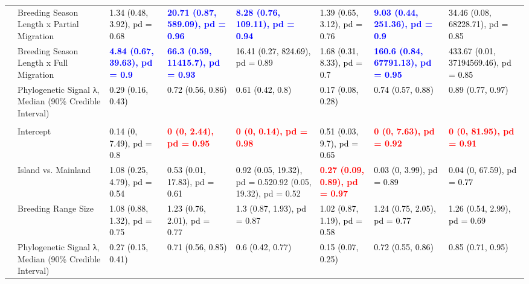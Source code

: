 \documentclass[
  a4paper,
]{article}
\begin{document}
\begin{landscape}
\begin{table}
{\begin{tabular}[t]{llllllll}
 & Breeding Season Length x Partial Migration & \textcolor{black}{1.34 (0.48, 3.92), pd = 0.68} & \textcolor{blue}{\textbf{20.71 (0.87, 589.09), pd = 0.96}} & \textcolor{blue}{\textbf{8.28 (0.76, 109.11), pd = 0.94}} & \textcolor{black}{1.39 (0.65, 3.12), pd = 0.76} & \textcolor{blue}{\textbf{9.03 (0.44, 251.36), pd = 0.9}} & \textcolor{black}{34.46 (0.08, 68228.71), pd = 0.85}\\
 & Breeding Season Length x Full Migration & \textcolor{blue}{\textbf{4.84 (0.67, 39.63), pd = 0.9}} & \textcolor{blue}{\textbf{66.3 (0.59, 11415.7), pd = 0.93}} & \textcolor{black}{16.41 (0.27, 824.69), pd = 0.89} & \textcolor{black}{1.68 (0.31, 8.33), pd = 0.7} & \textcolor{blue}{\textbf{160.6 (0.84, 67791.13), pd = 0.95}} & \textcolor{black}{433.67 (0.01, 37194569.46), pd = 0.85}\\
 & Phylogenetic Signal λ, Median (90\% Credible Interval) & \textcolor{black}{0.29 (0.16, 0.43)} & \textcolor{black}{0.72 (0.56, 0.86)} & \textcolor{black}{0.61 (0.42, 0.8)} & \textcolor{black}{0.17 (0.08, 0.28)} & \textcolor{black}{0.74 (0.57, 0.88)} & \textcolor{black}{0.89 (0.77, 0.97)}\\
\addlinespace[0.3em]
\multicolumn{1}{l}{\textbf{Breeding Spacing}}\\
\hspace{1em} & Intercept & \textcolor{black}{0.14 (0, 7.49), pd = 0.8} & \textcolor{red}{\textbf{0 (0, 2.44), pd = 0.95}} & \textcolor{red}{\textbf{0 (0, 0.14), pd = 0.98}} & \textcolor{black}{0.51 (0.03, 9.7), pd = 0.65} & \textcolor{red}{\textbf{0 (0, 7.63), pd = 0.92}} & \textcolor{red}{\textbf{0 (0, 81.95), pd = 0.91}}\\
\hspace{1em} & Island vs. Mainland & \textcolor{black}{1.08 (0.25, 4.79), pd = 0.54} & \textcolor{black}{0.53 (0.01, 17.83), pd = 0.61} & \textcolor{black}{0.92 (0.05, 19.32), pd = 0.52}{0.92 (0.05, 19.32), pd = 0.52} & \textcolor{red}{\textbf{0.27 (0.09, 0.89), pd = 0.97}} & \textcolor{black}{0.03 (0, 3.99), pd = 0.89} & \textcolor{black}{0.04 (0, 67.59), pd = 0.77}\\
\hspace{1em} & Breeding Range Size & \textcolor{black}{1.08 (0.88, 1.32), pd = 0.75} & \textcolor{black}{1.23 (0.76, 2.01), pd = 0.77} & \textcolor{black}{1.3 (0.87, 1.93), pd = 0.87} & \textcolor{black}{1.02 (0.87, 1.19), pd = 0.58} & \textcolor{black}{1.24 (0.75, 2.05), pd = 0.77} & \textcolor{black}{1.26 (0.54, 2.99), pd = 0.69}\\
\hspace{1em} & Phylogenetic Signal λ, Median (90\% Credible Interval) & \textcolor{black}{0.27 (0.15, 0.41)} & \textcolor{black}{0.71 (0.56, 0.85)} & \textcolor{black}{0.6 (0.42, 0.77)} & \textcolor{black}{0.15 (0.07, 0.25)} & \textcolor{black}{0.72 (0.55, 0.86)} & \textcolor{black}{0.85 (0.71, 0.95)}\\

\end{tabular}}
\end{table}
\end{landscape}
\end{document}
